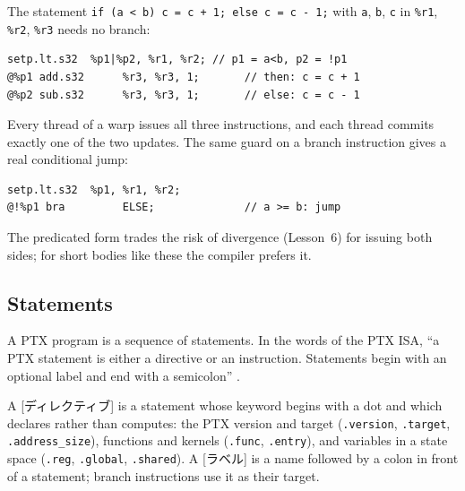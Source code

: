 \documentclass[../main.tex]{subfiles}
\begin{document}
\begin{example}
  \label{ex:l10-predication}
  The statement \texttt{if (a < b) c = c + 1; else c = c - 1;} with
  \texttt{a}, \texttt{b}, \texttt{c} in \texttt{\%r1}, \texttt{\%r2},
  \texttt{\%r3} needs no branch:
\begin{lstlisting}[language=PTX, numbers=none]
     setp.lt.s32  %p1|%p2, %r1, %r2; // p1 = a<b, p2 = !p1
@%p1 add.s32      %r3, %r3, 1;       // then: c = c + 1
@%p2 sub.s32      %r3, %r3, 1;       // else: c = c - 1
\end{lstlisting}
  Every thread of a warp issues all three instructions, and each thread
  commits exactly one of the two updates.  The same guard on a branch
  instruction gives a real conditional jump:
\begin{lstlisting}[language=PTX, numbers=none]
     setp.lt.s32  %p1, %r1, %r2;
@!%p1 bra         ELSE;              // a >= b: jump
\end{lstlisting}
\end{example}

  The predicated form trades the
risk of divergence (Lesson~6) for issuing both sides; for short bodies
like these the compiler prefers it.

\subsection{Statements}

A PTX program is a sequence of statements.  In the words of the PTX
ISA, \enquote{a PTX statement is either a directive or an instruction.
Statements begin with an optional label and end with a semicolon}
\cite[§4.3]{nvidia2026ptx}.

\begin{definition}
  A [ディレクティブ] is a statement whose keyword begins
  with a dot and which declares rather than computes: the PTX version
  and target (\texttt{.version}, \texttt{.target},
  \texttt{.address\_size}), functions and kernels (\texttt{.func},
  \texttt{.entry}), and variables in a state space (\texttt{.reg},
  \texttt{.global}, \texttt{.shared}).  A [ラベル] is a
  name followed by a colon in front of a statement; branch instructions
  use it as their target.
\end{definition}
\end{document}
